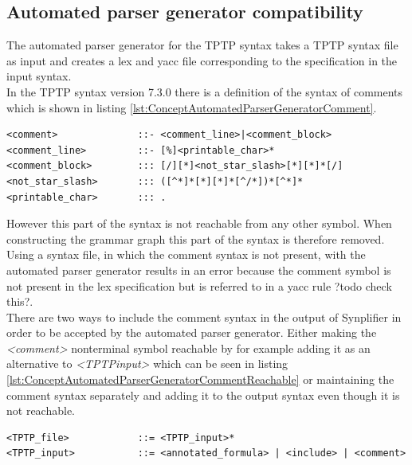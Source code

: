 \subsection{Automated parser generator compatibility}\label{sec:ConceptAutomatedParserGenerator}
The automated parser generator for the \ac{TPTP} syntax \cite{VS06} takes a \ac{TPTP} syntax file as input and creates a lex and yacc file corresponding to the specification in the input syntax.\\
In the \ac{TPTP} syntax version 7.3.0 there is a definition of the syntax of comments which is shown in listing \ref{lst:ConceptAutomatedParserGeneratorComment}.
\begin{lstlisting}[language=none, basicstyle=\scriptsize, caption=Comment syntax definition in the \ac{TPTP} syntax, label= lst:ConceptAutomatedParserGeneratorComment]
<comment>              ::- <comment_line>|<comment_block> 
<comment_line>         ::- [%]<printable_char>*
<comment_block>        ::: [/][*]<not_star_slash>[*][*]*[/]
<not_star_slash>       ::: ([^*]*[*][*]*[^/*])*[^*]*
<printable_char>       ::: .
\end{lstlisting}

However this part of the syntax is not reachable from any other symbol.
When constructing the grammar graph this part of the syntax is therefore removed.\\
Using a syntax file, in which the comment syntax is not present, with the automated parser generator results in an error because the comment symbol is not present in the lex specification but is referred to in a yacc rule ?todo check this?.\\
There are two ways to include the comment syntax in the output of \ac{Synplifier} in order to be accepted by the automated parser generator.
Either making the \textit{<comment>} nonterminal symbol reachable by for example adding it as an alternative to \textit{<TPTP\textunderscore input>} which can be seen in listing \ref{lst:ConceptAutomatedParserGeneratorCommentReachable} or maintaining the comment syntax separately and adding it to the output syntax even though it is not reachable.
\begin{lstlisting}[language=none, basicstyle=\scriptsize, caption=Making the comment syntax reachable, label= lst:ConceptAutomatedParserGeneratorCommentReachable]
<TPTP_file>            ::= <TPTP_input>*
<TPTP_input>           ::= <annotated_formula> | <include> | <comment>
\end{lstlisting}


